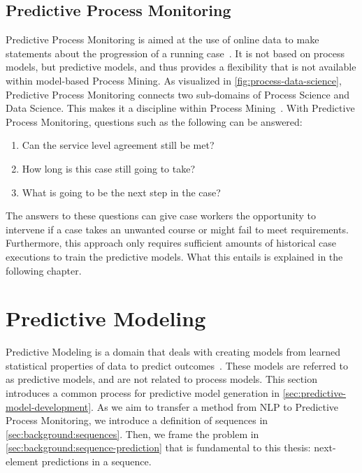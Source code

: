 \subsection{Predictive Process Monitoring}\label{sec:predictive-process-monitoring}
Predictive Process Monitoring is aimed at the use of online data to make statements about the progression of a running case~\cite{francescomarino2015, schoenig2018}. It is not based on process models, but predictive models, and thus provides a flexibility that is not available within model-based Process Mining.  As visualized in \autoref{fig:process-data-science}, Predictive Process Monitoring connects two sub-domains of Process Science and Data Science. This makes it a discipline within Process Mining~\cite{Aalst2016}. With Predictive Process Monitoring, questions such as the following can be answered:

\begin{enumerate}
    \item Can the service level agreement still be met?
    \item How long is this case still going to take?
    \item What is going to be the next step in the case?
\end{enumerate}

The answers to these questions can give case workers the opportunity to intervene if a case takes an unwanted course or might fail to meet requirements. Furthermore, this approach only requires sufficient amounts of historical case executions to train the predictive models. What this entails is explained in the following chapter.

\section{Predictive Modeling}\label{sec:predictive-modeling}
Predictive Modeling is a domain that deals with creating models from learned statistical properties of data to predict outcomes~\cite{sivaganesan1994predictive}. These models are referred to as predictive models, and are not related to process models. This section introduces a common process for predictive model generation in \autoref{sec:predictive-model-development}.
As we aim to transfer a method from NLP to Predictive Process Monitoring, we introduce a definition of sequences in \autoref{sec:background:sequences}. Then, we frame the problem in \autoref{sec:background:sequence-prediction} that is fundamental to this thesis: next-element predictions in a sequence.

